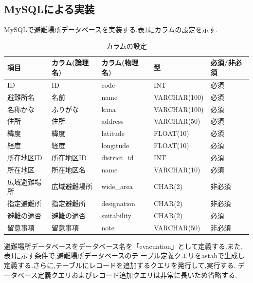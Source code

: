 \documentclass[a4j]{jarticle}
\begin{document}
    \subsection{MySQLによる実装}
    MySQLで避難場所データベースを実装する.表\ref{joken4}にカラムの設定を示す.
     \begin{table}[H]
      \caption{カラムの設定}
      \label{joken4}
      \begin{center}
        \begin{tabular}{l|l|l|l|l}\hline
          項目 & カラム(論理名) & カラム(物理名) & 型 & 必須/非必須 \\ \hline \hline
          ID & ID & code & INT & 必須 \\ \hline
          避難所名 & 名前 & name & VARCHAR(100) & 必須 \\ \hline
          名称かな & ふりがな & kana & VARCHAR(100) & 必須 \\ \hline
          住所 & 住所 & address & VARCHAR(50) & 必須 \\ \hline
          緯度 & 緯度 & latitude & FLOAT(10) & 必須 \\ \hline
          経度 & 経度 & longitude & FLOAT(10) & 必須 \\ \hline
          所在地区ID & 所在地区ID & district\_id & INT & 必須 \\ \hline
          所在地区 & 所在地区名 & name & VARCHAR(10) & 必須 \\ \hline
          広域避難場所 & 広域避難場所 & wide\_area & CHAR(2) & 非必須 \\ \hline
          指定避難所 & 指定避難所 & designation & CHAR(2) & 非必須 \\ \hline
          避難の適否 &  避難の適否 & suitability & CHAR(2) & 必須 \\ \hline
          留意事項 & 留意事項 & note & VARCHAR(50) & 非必須 \\ \hline
        \end{tabular}
      \end{center}
      \end{table}

      避難場所データベースをデータベース名を「evacuation」として定義する.また,表\ref{joken4}に示す条件で,避難場所データベースのテ
      ーブル定義クエリをastahで生成し定義する.さらに,テーブルにレコードを追加するクエリを発行して,実行する.
      データベース定義クエリおよびレコード追加クエリは非常に長いため省略する.
\end{document}
